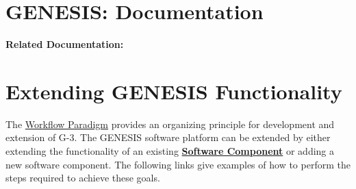 \documentclass[12pt]{article}
\begin{document}
\section*{GENESIS: Documentation}

{\bf Related Documentation:}



\section*{Extending GENESIS Functionality}

The \href{../workflow-intro/workflow-intro.tex}{Workflow Paradigm}
provides an organizing principle for development and extension of G-3.
The GENESIS software platform can be extended by either extending the
functionality of an existing
\href{../reserved-words/reserved-words.tex}{\bf Software Component} or
adding a new software component.  The following links give examples of
how to perform the steps required to achieve these goals.
\end{document}
